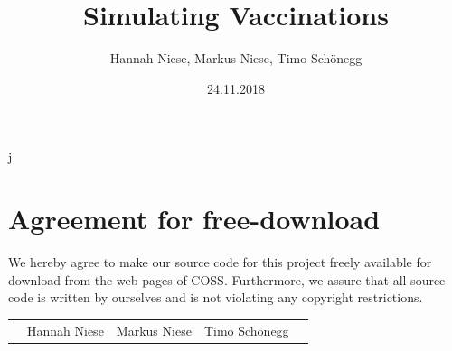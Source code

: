 \documentclass[11pt]{article}
\title{Simulating Vaccinations}
\author{Hannah Niese, Markus Niese, Timo Schönegg}
\date{24.11.2018}
\begin{document}
j


\newpage


\newpage
\section*{Agreement for free-download}
\bigskip


\bigskip


\large We hereby agree to make our source code for this project freely available for download from the web pages of COSS. Furthermore, we assure that all source code is written by ourselves and is not violating any copyright restrictions.

\begin{center}

\bigskip


\bigskip


\begin{tabular}{@{}p{0.5cm}@{}p{5.5cm}@{}p{5.5cm}@{}p{5.5cm}@{}p{1cm}}
\begin{minipage}{1cm}

\end{minipage}
&
\begin{minipage}{5cm}
\vspace{2mm} \large Hannah Niese

 \vspace{\baselineskip}

\end{minipage}
&
\begin{minipage}{5cm}

\large Markus Niese

\end{minipage}
&
\begin{minipage}{5cm}

\large Timo Schönegg

\end{minipage}
&
\begin{minipage}{1cm}

\end{minipage}

\end{tabular}


\end{center}
\newpage




\end{document}
